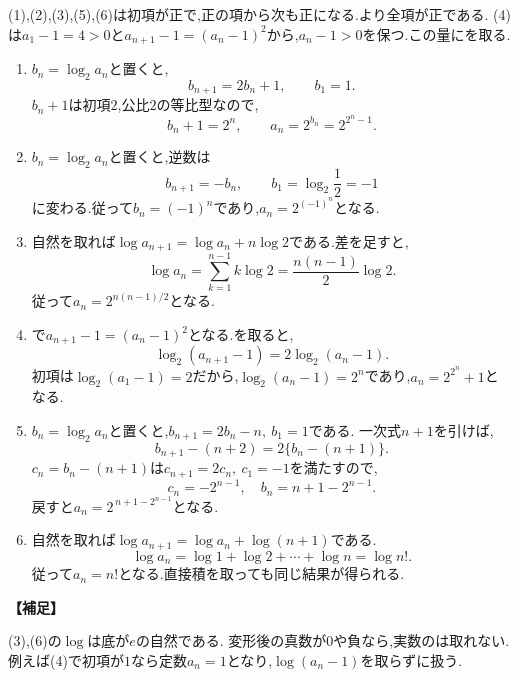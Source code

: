   (1),(2),(3),(5),(6)は初項が正で,正の項から次も正になる.より全項が正である.
  (4)は$a_1-1=4>0$と$a_{n+1}-1=(a_n-1)^2$から,$a_n-1>0$を保つ.この量にを取る.
  \begin{enumerate}[label=(\arabic*),parsep=3pt,format=\bookitemlink{example-logarithmic-1}{solution}{problem}]
    \item $b_n=\log_2a_n$と置くと,
          \[
            b_{n+1}=2b_n+1,\qquad b_1=1.
          \]
          $b_n+1$は初項$2$,公比$2$の等比型なので,
          \[
            b_n+1=2^n,\qquad a_n=2^{b_n}=2^{2^n-1}.
          \]
    \item $b_n=\log_2a_n$と置くと,逆数は
          \[
            b_{n+1}=-b_n,\qquad b_1=\log_2\frac12=-1
          \]
          に変わる.従って$b_n=(-1)^n$であり,$a_n=2^{(-1)^n}$となる.
    \item 自然を取れば$\log a_{n+1}=\log a_n+n\log2$である.差を足すと,
          \[
            \log a_n=\sum_{k=1}^{n-1}k\log2=\frac{n(n-1)}2\log2.
          \]
          従って$a_n=2^{n(n-1)/2}$となる.
    \item {}で$a_{n+1}-1=(a_n-1)^2$となる.を取ると,
          \[
            \log_2(a_{n+1}-1)=2\log_2(a_n-1).
          \]
          初項は$\log_2(a_1-1)=2$だから,$\log_2(a_n-1)=2^n$であり,$a_n=2^{2^n}+1$となる.
    \item $b_n=\log_2a_n$と置くと,$b_{n+1}=2b_n-n,\ b_1=1$である.
          一次式$n+1$を引けば,
          \[
            b_{n+1}-(n+2)=2\{b_n-(n+1)\}.
          \]
          $c_n=b_n-(n+1)$は$c_{n+1}=2c_n,\ c_1=-1$を満たすので,
          \[
            c_n=-2^{n-1},\quad b_n=n+1-2^{n-1}.
          \]
          戻すと$a_n=2^{\,n+1-2^{n-1}}$となる.
    \item 自然を取れば$\log a_{n+1}=\log a_n+\log(n+1)$である.
          \[
            \log a_n=\log1+\log2+\cdots+\log n=\log n!.
          \]
          従って$a_n=n!$となる.直接積を取っても同じ結果が得られる.
  \end{enumerate}
  \noindent\textbf{【補足】}

  (3),(6)の$\log$は底が$e$の自然である.
  変形後の真数が$0$や負なら,実数のは取れない.例えば(4)で初項が$1$なら定数$a_n=1$となり,$\log(a_n-1)$を取らずに扱う.

